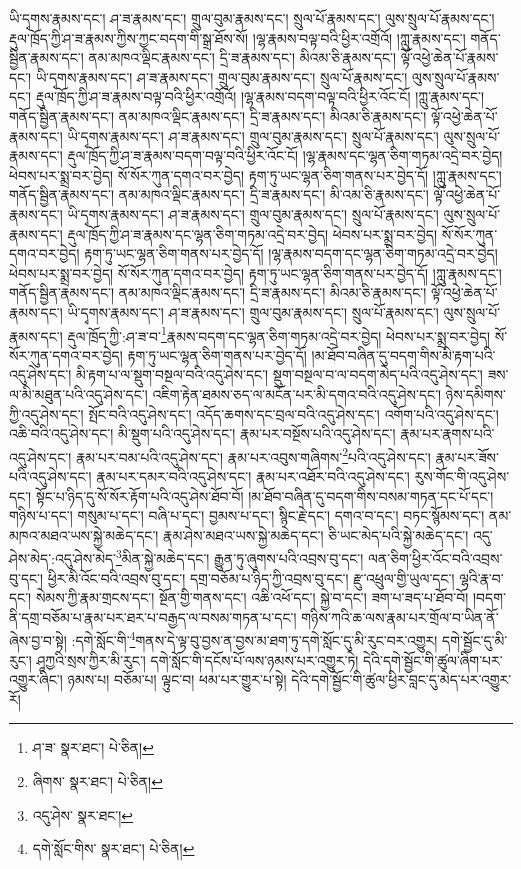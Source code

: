 ཡི་དྭགས་རྣམས་དང་། ཤ་ཟ་རྣམས་དང་། གྲུལ་བུམ་རྣམས་དང་། སྲུལ་པོ་རྣམས་དང་། ལུས་སྲུལ་པོ་རྣམས་དང་། རྡུལ་ཁྲོད་ཀྱི་ཤ་ཟ་རྣམས་ཀྱིས་ཀྱང་བདག་གི་སྒྲ་ཐོས་སོ། །ལྷ་རྣམས་བལྟ་བའི་ཕྱིར་འགྲོའོ། །ཀླུ་རྣམས་དང་། གནོད་སྦྱིན་རྣམས་དང་། ནམ་མཁའ་ལྡིང་རྣམས་དང་། དྲི་ཟ་རྣམས་དང་། མིའམ་ཅི་རྣམས་དང་། ལྟོ་འཕྱེ་ཆེན་པོ་རྣམས་དང་། ཡི་དྭགས་རྣམས་དང་། ཤ་ཟ་རྣམས་དང་། གྲུལ་བུམ་རྣམས་དང་། སྲུལ་པོ་རྣམས་དང་། ལུས་སྲུལ་པོ་རྣམས་དང་། རྡུལ་ཁྲོད་ཀྱི་ཤ་ཟ་རྣམས་བལྟ་བའི་ཕྱིར་འགྲོའོ། །ལྷ་རྣམས་བདག་བལྟ་བའི་ཕྱིར་འོང་ངོ། །ཀླུ་རྣམས་དང་། གནོད་སྦྱིན་རྣམས་དང་། ནམ་མཁའ་ལྡིང་རྣམས་དང་། དྲི་ཟ་རྣམས་དང་། མིའམ་ཅི་རྣམས་དང་། ལྟོ་འཕྱེ་ཆེན་པོ་རྣམས་དང་། ཡི་དྭགས་རྣམས་དང་། ཤ་ཟ་རྣམས་དང་། གྲུལ་བུམ་རྣམས་དང་། སྲུལ་པོ་རྣམས་དང་། ལུས་སྲུལ་པོ་རྣམས་དང་། རྡུལ་ཁྲོད་ཀྱི་ཤ་ཟ་རྣམས་བདག་བལྟ་བའི་ཕྱིར་འོང་ངོ། །ལྷ་རྣམས་དང་ལྷན་ཅིག་གཏམ་འདྲེ་བར་བྱེད། ཕེབས་པར་སྨྲ་བར་བྱེད། སོ་སོར་ཀུན་དགའ་བར་བྱེད། རྟག་ཏུ་ཡང་ལྷན་ཅིག་གནས་པར་བྱེད་དོ། །ཀླུ་རྣམས་དང་། གནོད་སྦྱིན་རྣམས་དང་། ནམ་མཁའ་ལྡིང་རྣམས་དང་། དྲི་ཟ་རྣམས་དང་། མི་འམ་ཅི་རྣམས་དང་། ལྟོ་འཕྱེ་ཆེན་པོ་རྣམས་དང་། ཡི་དྭགས་རྣམས་དང་། ཤ་ཟ་རྣམས་དང་། གྲུལ་བུམ་རྣམས་དང་། སྲུལ་པོ་རྣམས་དང་། ལུས་སྲུལ་པོ་རྣམས་དང་། རྡུལ་ཁྲོད་ཀྱི་ཤ་ཟ་རྣམས་དང་ལྷན་ཅིག་གཏམ་འདྲེ་བར་བྱེད། ཕེབས་པར་སྨྲ་བར་བྱེད། སོ་སོར་ཀུན་དགའ་བར་བྱེད། རྟག་ཏུ་ཡང་ལྷན་ཅིག་གནས་པར་བྱེད་དོ། །ལྷ་རྣམས་བདག་དང་ལྷན་ཅིག་གཏམ་འདྲེ་བར་བྱེད། ཕེབས་པར་སྨྲ་བར་བྱེད། སོ་སོར་ཀུན་དགའ་བར་བྱེད། རྟག་ཏུ་ཡང་ལྷན་ཅིག་གནས་པར་བྱེད་དོ། །ཀླུ་རྣམས་དང་། གནོད་སྦྱིན་རྣམས་དང་། ནམ་མཁའ་ལྡིང་རྣམས་དང་། དྲི་ཟ་རྣམས་དང་། མིའམ་ཅི་རྣམས་དང་། ལྟོ་འཕྱེ་ཆེན་པོ་རྣམས་དང་། ཡི་དྭགས་རྣམས་དང་། ཤ་ཟ་རྣམས་དང་། གྲུལ་བུམ་རྣམས་དང་། སྲུལ་པོ་རྣམས་དང་། ལུས་སྲུལ་པོ་རྣམས་དང་། རྡུལ་ཁྲོད་ཀྱི་:ཤ་ཟ་བ་\footnote{ཤ་ཟ་  སྣར་ཐང་།  པེ་ཅིན། }རྣམས་བདག་དང་ལྷན་ཅིག་གཏམ་འདྲེ་བར་བྱེད། ཕེབས་པར་སྨྲ་བར་བྱེད། སོ་སོར་ཀུན་དགའ་བར་བྱེད། རྟག་ཏུ་ཡང་ལྷན་ཅིག་གནས་པར་བྱེད་དོ། །མ་ཐོབ་བཞིན་དུ་བདག་གིས་མི་རྟག་པའི་འདུ་ཤེས་དང་། མི་རྟག་པ་ལ་སྡུག་བསྔལ་བའི་འདུ་ཤེས་དང་། སྡུག་བསྔལ་བ་ལ་བདག་མེད་པའི་འདུ་ཤེས་དང་། ཟས་ལ་མི་མཐུན་པའི་འདུ་ཤེས་དང་། འཇིག་རྟེན་ཐམས་ཅད་ལ་མངོན་པར་མི་དགའ་བའི་འདུ་ཤེས་དང་། ཉེས་དམིགས་ཀྱི་འདུ་ཤེས་དང་། སྤོང་བའི་འདུ་ཤེས་དང་། འདོད་ཆགས་དང་བྲལ་བའི་འདུ་ཤེས་དང་། འགོག་པའི་འདུ་ཤེས་དང་། འཆི་བའི་འདུ་ཤེས་དང་། མི་སྡུག་པའི་འདུ་ཤེས་དང་། རྣམ་པར་བསྔོས་པའི་འདུ་ཤེས་དང་། རྣམ་པར་རྣགས་པའི་འདུ་ཤེས་དང་། རྣམ་པར་བམ་པའི་འདུ་ཤེས་དང་། རྣམ་པར་འབུས་གཞིགས་\footnote{ཞིགས་  སྣར་ཐང་།  པེ་ཅིན། }པའི་འདུ་ཤེས་དང་། རྣམ་པར་ཟོས་པའི་འདུ་ཤེས་དང་། རྣམ་པར་དམར་བའི་འདུ་ཤེས་དང་། རྣམ་པར་འཐོར་བའི་འདུ་ཤེས་དང་། རུས་གོང་གི་འདུ་ཤེས་དང་། སྟོང་པ་ཉིད་དུ་སོ་སོར་རྟོག་པའི་འདུ་ཤེས་ཐོབ་བོ། །མ་ཐོབ་བཞིན་དུ་བདག་གིས་བསམ་གཏན་དང་པོ་དང་། གཉིས་པ་དང་། གསུམ་པ་དང་། བཞི་པ་དང་། བྱམས་པ་དང་། སྙིང་རྗེ་དང་། དགའ་བ་དང་། བཏང་སྙོམས་དང་། ནམ་མཁའ་མཐའ་ཡས་སྐྱེ་མཆེད་དང་། རྣམ་ཤེས་མཐའ་ཡས་སྐྱེ་མཆེད་དང་། ཅི་ཡང་མེད་པའི་སྐྱེ་མཆེད་དང་། འདུ་ཤེས་མེད་:འདུ་ཤེས་མེད་\footnote{འདུ་ཤེས་  སྣར་ཐང་། }མིན་སྐྱེ་མཆེད་དང་། རྒྱུན་ཏུ་ཞུགས་པའི་འབྲས་བུ་དང་། ལན་ཅིག་ཕྱིར་འོང་བའི་འབྲས་བུ་དང་། ཕྱིར་མི་འོང་བའི་འབྲས་བུ་དང་། དགྲ་བཅོམ་པ་ཉིད་ཀྱི་འབྲས་བུ་དང་། རྫུ་འཕྲུལ་གྱི་ཡུལ་དང་། ལྷའི་རྣ་བ་དང་། སེམས་ཀྱི་རྣམ་གྲངས་དང་། སྔོན་གྱི་གནས་དང་། འཆི་འཕོ་དང་། སྐྱེ་བ་དང་། ཟག་པ་ཟད་པ་ཐོབ་བོ། །བདག་ནི་དགྲ་བཅོམ་པ་རྣམ་པར་ཐར་པ་བརྒྱད་ལ་བསམ་གཏན་པ་དང་། གཉིས་ཀའི་ཆ་ལས་རྣམ་པར་གྲོལ་བ་ཡིན་ནོ་ཞེས་བྱ་བ་སྟེ། :དགེ་སློང་གི་\footnote{དགེ་སློང་གིས་  སྣར་ཐང་།  པེ་ཅིན། }གནས་དེ་ལྟ་བུ་བྱས་ན་བྱས་མ་ཐག་ཏུ་དགེ་སློང་དུ་མི་རུང་བར་འགྱུར། དགེ་སྦྱོང་དུ་མི་རུང་། ཤཱཀྱའི་སྲས་ཀྱིར་མི་རུང་། དགེ་སློང་གི་དངོས་པོ་ལས་ཉམས་པར་འགྱུར་ཏེ། དེའི་དགེ་སྦྱོང་གི་ཚུལ་ཞིག་པར་འགྱུར་ཞིང་། ཉམས་པ། བཅོམ་པ། ལྟུང་བ། ཕམ་པར་གྱུར་པ་སྟེ། དེའི་དགེ་སྦྱོང་གི་ཚུལ་ཕྱིར་བླང་དུ་མེད་པར་འགྱུར་རོ། 